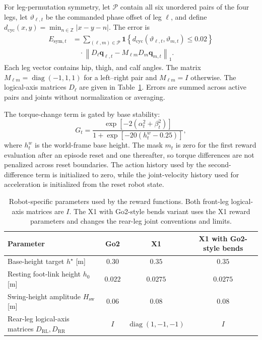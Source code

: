 For leg-permutation symmetry, let $\mathcal P$ contain all six unordered pairs of the four legs, let $\vartheta_{\ell,t}$ be the commanded phase offset of leg $\ell$, and define $d_{\mathrm{cyc}}(x,y)=\min_{n\in\mathbb Z}|x-y-n|$. The error is
\begin{equation}
\begin{aligned}
    E_{\mathrm{sym},t}
    &=\sum_{(\ell,m)\in\mathcal P}
    \mathbf 1\!\left\{d_{\mathrm{cyc}}(\vartheta_{\ell,t},\vartheta_{m,t})\leq0.02\right\}\\
    &\quad\cdot
    \left\|D_\ell\mathbf q_{\ell,t}
    -M_{\ell m}D_m\mathbf q_{m,t}\right\|_1.
\end{aligned}
\end{equation}
Each leg vector contains hip, thigh, and calf angles. The matrix $M_{\ell m}=\operatorname{diag}(-1,1,1)$ for a left--right pair and $M_{\ell m}=I$ otherwise. The logical-axis matrices $D_\ell$ are given in Table~\ref{tab:locomotion_reward_parameters}. Errors are summed across active pairs and joints without normalization or averaging.

The torque-change term is gated by base stability:
\begin{equation}
    G_t
    =\frac{\exp[-2(\alpha_t^2+\beta_t^2)]}
    {1+\exp[-20(h_t^w-0.25)]},
\end{equation}
where $h_t^w$ is the world-frame base height. The mask $m_t$ is zero for the first reward evaluation after an episode reset and one thereafter, so torque differences are not penalized across reset boundaries. The action history used by the second-difference term is initialized to zero, while the joint-velocity history used for acceleration is initialized from the reset robot state.

\begin{table}[t]
    \centering
    \small
    \setlength{\tabcolsep}{8pt}
    \renewcommand{\arraystretch}{1.2}
    \caption{Robot-specific parameters used by the reward functions. Both front-leg logical-axis matrices are $I$. The X1 with Go2-style bends variant uses the X1 reward parameters and changes the rear-leg joint conventions and limits.}
    \label{tab:locomotion_reward_parameters}
    \begin{tabular}{@{}lccc@{}}
        \toprule
        Parameter & Go2 & X1 & X1 with Go2-style bends \\
        \midrule
        Base-height target $h^\star$ [m] & $0.30$ & $0.35$ & $0.35$ \\
        Resting foot-link height $h_0$ [m] & $0.022$ & $0.0275$ & $0.0275$ \\
        Swing-height amplitude $H_{\mathrm{sw}}$ [m] & $0.06$ & $0.08$ & $0.08$ \\
        Rear-leg logical-axis matrices $D_{\mathrm{RL}},D_{\mathrm{RR}}$ & $I$ & $\operatorname{diag}(1,-1,-1)$ & $I$ \\
        \bottomrule
    \end{tabular}
\end{table}
